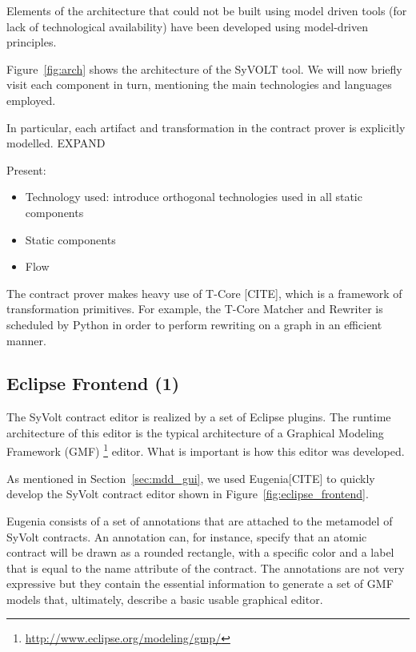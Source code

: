 \begin{itemize}
\end{itemize}

Elements of the
architecture that could not be built using model driven tools (for lack of
technological availability) have been developed using model-driven principles.



Figure~\ref{fig:arch} shows the architecture of the SyVOLT tool. We will now
briefly visit each component in turn, mentioning the main technologies and
languages employed.


In particular, each artifact and transformation in the contract prover is
explicitly modelled. EXPAND

Present:
\begin{itemize}
  \item Technology used: introduce orthogonal technologies used in all
  static components
  \item Static components
  \item Flow
\end{itemize}

The contract prover makes heavy use of T-Core [CITE], which is a framework of
transformation primitives. For example, the T-Core Matcher and Rewriter is
scheduled by Python in order to perform rewriting on a graph in an efficient
manner.


\subsection{Eclipse Frontend (1)}

The SyVolt contract editor is realized by a set of Eclipse plugins.
The runtime architecture of this editor is the typical architecture of a Graphical Modeling Framework (GMF) \footnote{\url{http://www.eclipse.org/modeling/gmp/}} editor. 
What is important is how this editor was developed.

As mentioned in Section~\ref{sec:mdd_gui}, we used Eugenia[CITE] to quickly develop the SyVolt contract editor shown in Figure~\ref{fig:eclipse_frontend}.

Eugenia consists of a set of annotations that are attached to the metamodel of
SyVolt contracts. An annotation can, for instance, specify that an atomic contract will be drawn as a rounded rectangle, with a specific color and a label that is equal to the name attribute of the contract.
The annotations are not very expressive but they contain the essential information to generate a set of GMF models that, ultimately, describe a basic usable graphical editor. 

